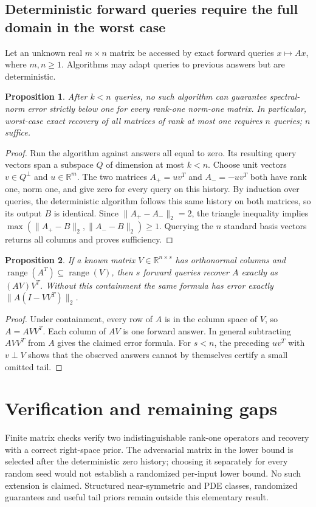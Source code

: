\documentclass[11pt]{article}
\newtheorem{proposition}{Proposition}
\begin{document}
\subsection{Deterministic forward queries require the full domain in the worst case}
Let an unknown real $m\times n$ matrix be accessed by exact forward queries $x\mapsto Ax$, where $m,n\ge1$. Algorithms may adapt queries to previous answers but are deterministic.
\begin{proposition}
After $k<n$ queries, no such algorithm can guarantee spectral-norm error strictly below one for every rank-one norm-one matrix. In particular, worst-case exact recovery of all matrices of rank at most one requires $n$ queries; $n$ suffice.
\end{proposition}
\begin{proof}
Run the algorithm against answers all equal to zero. Its resulting query vectors span a subspace $Q$ of dimension at most $k<n$. Choose unit vectors $v\in Q^\perp$ and $u\in\mathbb R^m$. The two matrices $A_+=uv^T$ and $A_-=-uv^T$ both have rank one, norm one, and give zero for every query on this history. By induction over queries, the deterministic algorithm follows this same history on both matrices, so its output $B$ is identical. Since $\|A_+-A_-\|_2=2$, the triangle inequality implies $\max(\|A_+-B\|_2,\|A_--B\|_2)\ge1$. Querying the $n$ standard basis vectors returns all columns and proves sufficiency.
\end{proof}
\begin{proposition}
If a known matrix $V\in\mathbb R^{n\times s}$ has orthonormal columns and $\operatorname{range}(A^T)\subseteq\operatorname{range}(V)$, then $s$ forward queries recover $A$ exactly as $(AV)V^T$. Without this containment the same formula has error exactly $\|A(I-VV^T)\|_2$.
\end{proposition}
\begin{proof}
Under containment, every row of $A$ is in the column space of $V$, so $A=AVV^T$. Each column of $AV$ is one forward answer. In general subtracting $AVV^T$ from $A$ gives the claimed error formula. For $s<n$, the preceding $uv^T$ with $v\perp V$ shows that the observed answers cannot by themselves certify a small omitted tail.
\end{proof}
\section{Verification and remaining gaps}
Finite matrix checks verify two indistinguishable rank-one operators and recovery with a correct right-space prior. The adversarial matrix in the lower bound is selected after the deterministic zero history; choosing it separately for every random seed would not establish a randomized per-input lower bound. No such extension is claimed. Structured near-symmetric and PDE classes, randomized guarantees and useful tail priors remain outside this elementary result.
\end{document}
